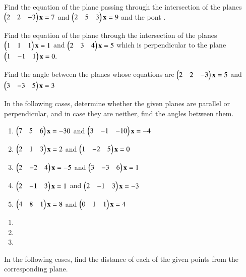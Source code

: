 \item Find the equation of the plane passing through the intersection of the planes 
$
\begin{pmatrix}2 & 2 & -3\end{pmatrix}\mathbf{x}=7
$
 and 
$
\begin{pmatrix}2 & 5 & 3\end{pmatrix}\mathbf{x}=9
$
and the pont .
%
\item  Find the equation of the plane through the intersection of the planes
$
\begin{pmatrix}1 & 1 & 1\end{pmatrix}\mathbf{x}=1
$
 and 
$
\begin{pmatrix}2 & 3 & 4\end{pmatrix}\mathbf{x}=5
$
which is perpendicular to the plane 
$
\begin{pmatrix}1 & -1 & 1\end{pmatrix}\mathbf{x}=0.
$
%
\item Find the angle between the planes whose equations are
$
\begin{pmatrix}2 & 2 & -3\end{pmatrix}\mathbf{x}=5
$
 and 
$
\begin{pmatrix}3 & -3 & 5\end{pmatrix}\mathbf{x}=3
$
\\
\solution

%
\item In the following cases, determine whether the given planes are parallel or perpendicular, and in case they are neither, find the angles between them.
\begin{enumerate}
\item 
$
\begin{pmatrix}7 & 5 & 6\end{pmatrix}\mathbf{x}=-30
$
 and 
$
\begin{pmatrix}3 & -1 & -10\end{pmatrix}\mathbf{x}=-4
$
%
\item 
$
\begin{pmatrix}2 & 1 & 3\end{pmatrix}\mathbf{x}=2
$
 and 
$
\begin{pmatrix}1 & -2 & 5\end{pmatrix}\mathbf{x}=0
$
%
\item 
$
\begin{pmatrix}2 & -2 & 4\end{pmatrix}\mathbf{x}=-5
$
 and 
$
\begin{pmatrix}3 & -3 & 6\end{pmatrix}\mathbf{x}=1
$
\item 
$
\begin{pmatrix}2 & -1 & 3\end{pmatrix}\mathbf{x}=1
$
 and 
$
\begin{pmatrix}2 & -1 & 3\end{pmatrix}\mathbf{x}=-3
$
\item 
$
\begin{pmatrix}4 & 8 & 1\end{pmatrix}\mathbf{x}=8
$
 and 
$
\begin{pmatrix}0 & 1 & 1\end{pmatrix}\mathbf{x}=4
$
\end{enumerate}
\solution
\begin{enumerate}
    \item 
    
    \item 
    
    \item 
    
\end{enumerate}
\item In the following cases, find the distance of each of the given points from the corresponding plane.
\begin{table}[!h]
\centering

\caption{}
\label{table:3d}
\end{table}
